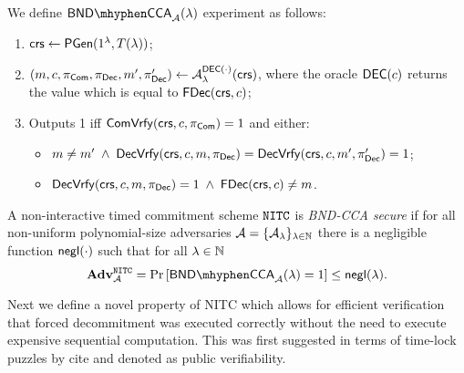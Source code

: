 \begin{definition}
\label{def:nitc-bnd}
We define $\mathsf{BND \mhyphen CCA}_\adv(\secpar)$ experiment as follows:
\begin{enumerate}
\item $\mathsf{crs} \leftarrow \mathsf{PGen}(1{^{\lambda}}, T(\lambda))$;
\item $(m, c, \pi_{\mathsf{Com}}, \pi_{\mathsf{Dec}}, m', \pi_{\mathsf{Dec}}') \leftarrow \mathcal{A}_{\lambda}^{\mathsf{DEC}(\cdot)}(\mathsf{crs})$, where the oracle $\mathsf{DEC}(c)$ returns the value which is equal to $\mathsf{FDec}(\mathsf{crs}, c)$;
\item Outputs 1 iff $\mathsf{ComVrfy}(\mathsf{crs}, c, \pi_{\mathsf{Com}})= 1$ and either:
\begin{itemize}
\item $m \neq m' \; \land \; \mathsf{DecVrfy}(\mathsf{crs}, c, m, \pi_{\mathsf{Dec}}) = \mathsf{DecVrfy}(\mathsf{crs}, c, m', \pi_{\mathsf{Dec}}') = 1$;
\item $\mathsf{DecVrfy}(\mathsf{crs}, c, m, \pi_{\mathsf{Dec}}) = 1 \; \land \; \mathsf{FDec}(\mathsf{crs}, c) \neq m$.
\end{itemize}
\end{enumerate}
A non-interactive timed commitment scheme $\mathtt{NITC}$ is \emph{BND-CCA secure} if for all non-uniform polynomial-size adversaries $\mathcal{A} = \{\mathcal{A}_{\lambda}\}_{\lambda \in \mathbb{N}}$ there is a negligible function $\mathsf{negl}(\cdot)$ such that for all $\lambda \in \mathbb{N}$ 
\[ \advtg^{\nitc}_{\adv} = 
\Pr\left[ \mathsf{BND \mhyphen CCA}_\adv(\secpar) = 1 \right] \leq \negl(\secpar). 
\]
\end{definition}

%

Next we define a novel property of NITC which allows for efficient verification that forced decommitment was executed correctly without the need to execute expensive sequential computation. This was first suggested in terms of time-lock puzzles by cite{} and denoted as public verifiability.

